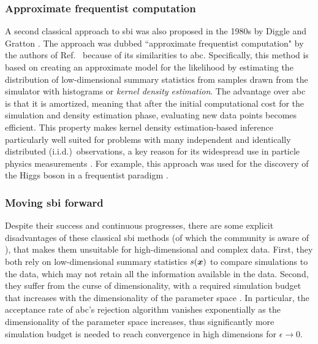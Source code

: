 \subsubsection{Approximate frequentist computation}

A second classical approach to \gls*{sbi} was also proposed in the 1980s by Diggle and Gratton \cite{diggle1984monte}. The approach was dubbed ``approximate frequentist computation" by the authors of Ref.~\cite{brehmer2018guide} because of its similarities to \gls*{abc}. Specifically, this method is based on creating an approximate model for the likelihood by estimating the distribution of low-dimensional summary statistics from samples drawn from the simulator with histograms or \emph{kernel density estimation}. The advantage over \gls*{abc} is that it is amortized, meaning that after the initial computational cost for the simulation and density estimation phase, evaluating new data points becomes efficient. 
This property makes kernel density estimation-based inference particularly well suited for problems with many independent and identically distributed (i.i.d.)~observations, a key reason for its widespread use in particle physics measurements \cite{Brehmer:2020cvb}. For example, this approach was used for the discovery of the Higgs boson in a frequentist paradigm \cite{brehmer2018guide}. 


\subsubsection{Moving \gls*{sbi} forward}

Despite their success and continuous progresses, there are some explicit disadvantages of these classical \gls*{sbi} methods (of which the community is aware of \cite[see \eg][]{Trotta:2017wnx}), that makes them unsuitable for high-dimensional and complex data. First, they both rely on low-dimensional summary statistics $s(\bm{x})$ to compare simulations to the data, which may not retain all the information available in the data. Second, they suffer from the curse of dimensionality, with a required simulation budget that increases with the dimensionality of the parameter space \cite[\eg][]{Leclercq:2018who}. In particular, the acceptance rate of \gls*{abc}'s rejection algorithm vanishes exponentially as the dimensionality of the parameter space increases, thus significantly more simulation budget is needed to reach convergence in high dimensions for $\epsilon \to 0$.

